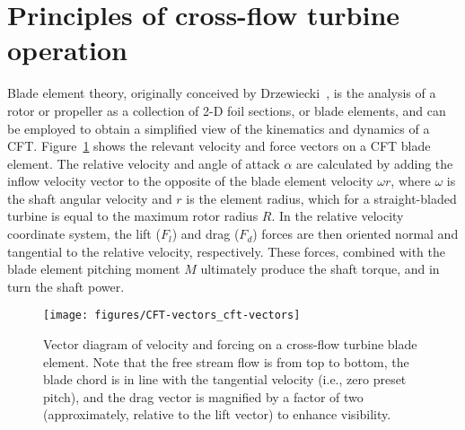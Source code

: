 \section{Principles of cross-flow turbine operation}

Blade element theory, originally conceived by
Drzewiecki~\cite{Drzewiecki1892,Drzewiecki1920}, is the analysis of a rotor or
propeller as a collection of 2-D foil sections, or blade elements, and can be
employed to obtain a simplified view of the kinematics and dynamics of a CFT.
Figure~\ref{fig:vectors} shows the relevant velocity and force vectors on a CFT
blade element. The relative velocity and angle of attack $\alpha$ are calculated
by adding the inflow velocity vector to the opposite of the blade element
velocity $\omega r$, where $\omega$ is the shaft angular velocity and $r$ is the
element radius, which for a straight-bladed turbine is equal to the maximum
rotor radius $R$. In the relative velocity coordinate system, the lift ($F_l$)
and drag ($F_d$) forces are then oriented normal and tangential to the relative
velocity, respectively. These forces, combined with the blade element pitching
moment $M$ ultimately produce the shaft torque, and in turn the shaft power.

\begin{figure}
    \centering
    
    \texttt{[image: figures/CFT-vectors\_cft-vectors]}
    
    \caption{Vector diagram of velocity and forcing on a cross-flow turbine
        blade element. Note that the free stream flow is from top to bottom, the
        blade chord is in line with the tangential velocity (i.e., zero preset
        pitch), and the drag vector is magnified by a factor of two (approximately,
        relative to the lift vector) to enhance visibility.}
    
    \label{fig:vectors}
\end{figure}

